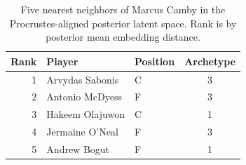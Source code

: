 \begin{table}[htbp]
  \centering\small
  \begin{tabular}{rllc}
    \toprule
    Rank & Player & Position & Archetype \\
    \midrule
    1 & Arvydas Sabonis & C & 3 \\
    2 & Antonio McDyess & F & 3 \\
    3 & Hakeem Olajuwon & C & 1 \\
    4 & Jermaine O'Neal & F & 3 \\
    5 & Andrew Bogut & F & 1 \\
    \bottomrule
  \end{tabular}
  \caption{Five nearest neighbors of Marcus Camby in the Procrustes-aligned posterior latent space. Rank is by posterior mean embedding distance.}
  \label{tab:Marcus_Camby_neighbors}
\end{table}

